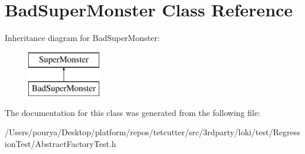 \hypertarget{classBadSuperMonster}{}\section{Bad\+Super\+Monster Class Reference}
\label{classBadSuperMonster}
Inheritance diagram for Bad\+Super\+Monster\+:\begin{figure}[H]
\begin{center}
\leavevmode
\includegraphics[height=2.000000cm]{classBadSuperMonster}
\end{center}
\end{figure}


The documentation for this class was generated from the following file\+:\begin{DoxyCompactItemize}
\item 
/\+Users/pourya/\+Desktop/platform/repos/tetcutter/src/3rdparty/loki/test/\+Regression\+Test/Abstract\+Factory\+Test.\+h\end{DoxyCompactItemize}
